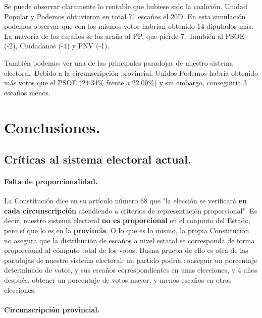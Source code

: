 \documentclass[11pt]{article}
\begin{document}
	Se puede observar claramente lo rentable que hubiese sido la coalición. Unidad Popular y Podemos obtuvieron en total 71 escaños el 20D. En esta simulación podemos observar que con los mismos votos habrían obtenido 14 diputados más. La mayoría de los escaños se los araña al PP, que pierde 7. También al PSOE (-2), Ciudadanos (-4) y PNV (-1).
	
	También podemos ver una de las principales paradojas de nuestro sistema electoral. Debido a la circunscripción provincial, Unidos Podemos habría obtenido más votos que el PSOE (24.34\% frente a 22.00\%) y sin embargo, conseguiría 3 escaños menos.
	
	\newpage

	\section{Conclusiones.}
	
	\subsection{Críticas al sistema electoral actual.}
	
	\paragraph{Falta de proporcionalidad.}
	
	La Constitución dice en su artículo número 68 que "la elección se verificará \textbf{en cada circunscripción} atendiendo a criterios de representación proporcional". Es decir, nuestro sistema electoral \textbf{no es proporcional} en el conjunto del Estado, pero sí que lo es en la \textbf{provincia}. O lo que es lo mismo, la propia Constitución no asegura que la distribución de escaños a nivel estatal se corresponda de forma proporcional al cómputo total de los votos. Buena prueba de ello es otra de las paradojas de nuestro sistema electoral: un partido podría conseguir un porcentaje determinado de votos, y sus escaños correspondientes en unas elecciones, y 4 años después, obtener un porcentaje de votos mayor, y menos escaños en otras elecciones.
	
	\paragraph{Circunscripción provincial.}
	
\end{document}

